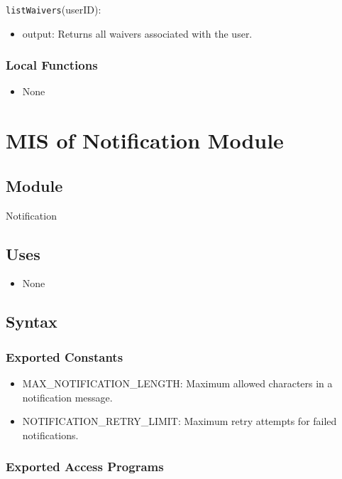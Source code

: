 \documentclass[12pt, titlepage]{article}
\begin{document}
\noindent \texttt{listWaivers}(userID):  
\begin{itemize}
    \item output: Returns all waivers associated with the user.
\end{itemize}

\subsubsection{Local Functions}
\begin{itemize}
    \item None
\end{itemize}

\section{MIS of Notification Module} \label{Module:Notification}

\subsection{Module}

Notification

\subsection{Uses}

\begin{itemize}
    \item None
\end{itemize}

\subsection{Syntax}

\subsubsection{Exported Constants}

\begin{itemize}
    \item MAX\_NOTIFICATION\_LENGTH: Maximum allowed characters in a notification message.
    \item NOTIFICATION\_RETRY\_LIMIT: Maximum retry attempts for failed notifications.
\end{itemize}

\subsubsection{Exported Access Programs}
\end{document}
